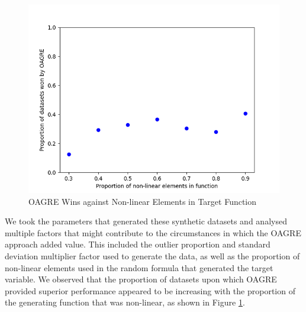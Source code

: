 \documentclass[12pt,a4paper]{article}
\begin{document}
\begin{table}
\caption{Overall Results}
\label{tab:results}
\end{table}

\begin{figure}
\centering
\includegraphics[scale=0.7]{../results/wins_vs_nonlinear_prop.png}
\caption{OAGRE Wins against Non-linear Elements in Target Function}
\label{fig:nonlinear}
\end{figure}

We took the parameters that generated these synthetic datasets and analysed multiple factors that might contribute
to the circumstances in which the OAGRE approach added value. This included the outlier proportion and standard deviation
multiplier factor used to generate the data, as well as the proportion of non-linear elements used in the random formula that
generated the target variable. We observed that the proportion of datasets upon which OAGRE provided superior performance
appeared to be increasing with the proportion of the generating function that was non-linear, as shown in Figure \ref{fig:nonlinear}.
\end{document}
